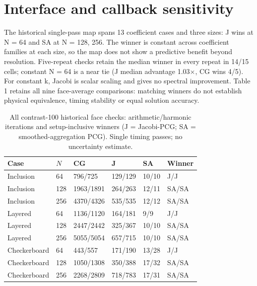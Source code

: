 \documentclass[10pt]{article}
\begin{document}
\section{Interface and callback sensitivity}
The historical single-pass map spans 13 coefficient cases and three sizes: J wins at N = 64 and SA at N = 128, 256. The winner is constant across coefficient families at each size, so the map does not show a predictive benefit beyond resolution. Five-repeat checks retain the median winner in every repeat in 14/15 cells; constant N = 64 is a near tie (J median advantage 1.03\ensuremath{\times}, CG wins 4/5). For constant k, Jacobi is scalar scaling and gives no spectral improvement. Table 1 retains all nine face-average comparisons: matching winners do not establish physical equivalence, timing stability or equal solution accuracy.\par
\begin{table}[htbp]
\centering
\caption{All contrast-100 historical face checks: arithmetic/harmonic iterations and setup-inclusive winners (J = Jacobi-PCG; SA = smoothed-aggregation PCG). Single timing passes; no uncertainty estimate.}
\label{tab:face-main}
\small
\begin{tabular}{llllll}
\toprule
Case & $N$ & CG & J & SA & Winner \\
\midrule
Inclusion & 64 & 796/725 & 129/129 & 10/10 & J/J \\
Inclusion & 128 & 1963/1891 & 264/263 & 12/11 & SA/SA \\
Inclusion & 256 & 4370/4326 & 535/535 & 12/12 & SA/SA \\
Layered & 64 & 1136/1120 & 164/181 & 9/9 & J/J \\
Layered & 128 & 2447/2442 & 325/367 & 10/10 & SA/SA \\
Layered & 256 & 5055/5054 & 657/715 & 10/10 & SA/SA \\
Checkerboard & 64 & 443/557 & 171/190 & 13/28 & J/J \\
Checkerboard & 128 & 1050/1308 & 350/388 & 17/32 & SA/SA \\
Checkerboard & 256 & 2268/2809 & 718/783 & 17/31 & SA/SA \\
\bottomrule
\end{tabular}
\end{table}
\end{document}
